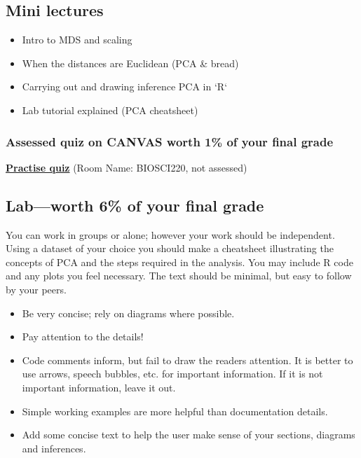 \documentclass{article}
\begin{document}
\subsection*{Mini lectures}

\begin{itemize}
\item Intro to MDS and scaling
\item When the distances are Euclidean (PCA \& bread)
\item Carrying out and drawing inference PCA in `R`
\item Lab tutorial explained (PCA cheatsheet)
\end{itemize}

\subsubsection*{Assessed quiz on CANVAS worth 1\% of your final grade}

\begin{center}
  \href{https://b.socrative.com/login/student/}{\textbf{\Large Practise quiz}} (Room Name: BIOSCI220, not assessed)
  
\end{center}



\subsection*{Lab---worth 6\% of your final grade}

You can work in groups or alone; however your work should be independent. Using a dataset of your choice you should make a cheatsheet illustrating the concepts of PCA and the steps required in the analysis. You may include R code and any plots you feel necessary. The text should be minimal, but easy to follow by your peers. 

\begin{itemize}
\item Be very concise; rely on diagrams where possible.

\item Pay attention to the details!

\item Code comments inform, but fail to draw the readers attention. It is better to use arrows, speech bubbles, etc. for important information. If it is not important information, leave it out.

\item Simple working examples are more helpful than documentation details.

\item Add some concise text to help the user make sense of your sections, diagrams and inferences.
\end{itemize}
\end{document}
